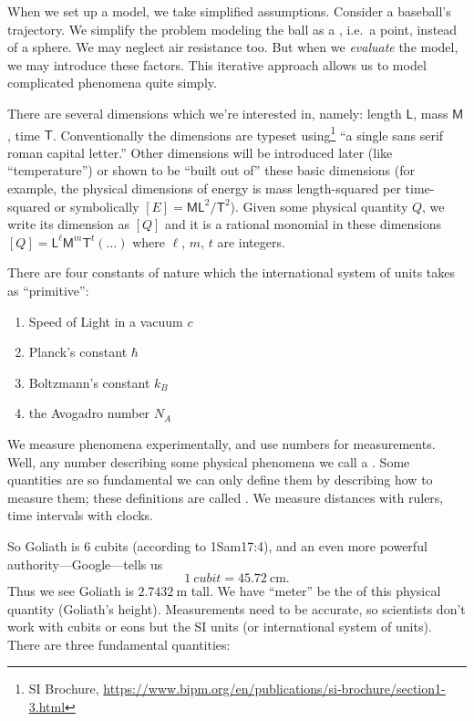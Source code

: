 When we set up a model, we take simplified assumptions. Consider
a baseball's trajectory. We simplify the problem modeling the
ball as a , i.e.~a point, instead of a
sphere. We may neglect air resistance too. But when we
\emph{evaluate} the model, we may introduce these factors. This
iterative approach allows us to model complicated phenomena quite
simply.

There are several dimensions which we're interested in, namely: length
$\mathsf{L}$, mass $\mathsf{M}$, time $\mathsf{T}$. Conventionally the
dimensions are typeset using\footnote{SI
Brochure, \url{https://www.bipm.org/en/publications/si-brochure/section1-3.html}}
``a single sans serif roman capital letter.'' Other dimensions will be
introduced later (like ``temperature'') or shown to be ``built out of''
these basic dimensions (for example, the physical dimensions of energy
is mass length-squared per time-squared or symbolically
$[E] = \mathsf{ML}^{2}/\mathsf{T}^{2}$).
Given
some physical quantity $Q$, we write its dimension as
$[Q]$ and it is a rational monomial in these dimensions
$[Q]=\mathsf{L}^{\ell}\mathsf{M}^{m}\mathsf{T}^{t}(\dots)$ where $\ell$,
$m$, $t$ are integers.

There are four constants of nature which the international system of
units takes as ``primitive'':
\begin{enumerate}
    \item Speed of Light in a vacuum $c$
    \item Planck's constant $\hbar$
    \item Boltzmann's constant $k_{B}$
    \item the Avogadro number $N_{A}$
\end{enumerate}

\label{M:intro:standards-and-units}
We measure phenomena experimentally, and use numbers  for
measurements. Well, any number describing some physical phenomena
we call a . Some
quantities are so fundamental we can only define them by describing how
to measure them; these definitions are called .
We measure distances with rulers, time intervals with clocks.

So Goliath is 6 cubits (according to 1Sam17:4), and an even more
powerful authority---Google---tells us
\begin{equation}
\SI{1}{cubit}=\SI{45.72}{\centi\meter}.
\end{equation}
Thus we see Goliath is $\SI{2.7432}{\meter}$ tall. We have
``meter'' be the  of this physical quantity
(Goliath's height). Measurements need to be accurate, so
scientists don't work with cubits or eons but the SI units (or
international system of units). There are three fundamental
quantities:

